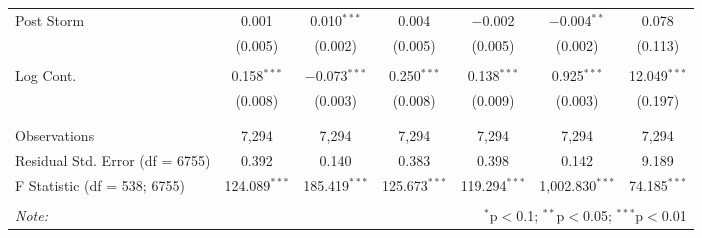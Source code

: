 \begin{table}[!htbp]
\begin{tabular}{@{\extracolsep{5pt}}lcccccc}
 Post Storm & 0.001 & 0.010$^{***}$ & 0.004 & $-$0.002 & $-$0.004$^{**}$ & 0.078 \\ 
  & (0.005) & (0.002) & (0.005) & (0.005) & (0.002) & (0.113) \\ 
  & & & & & & \\ 
 Log Cont. & 0.158$^{***}$ & $-$0.073$^{***}$ & 0.250$^{***}$ & 0.138$^{***}$ & 0.925$^{***}$ & 12.049$^{***}$ \\ 
  & (0.008) & (0.003) & (0.008) & (0.009) & (0.003) & (0.197) \\ 
  & & & & & & \\ 
\hline \\[-1.8ex] 
Observations & 7,294 & 7,294 & 7,294 & 7,294 & 7,294 & 7,294 \\ 
Residual Std. Error (df = 6755) & 0.392 & 0.140 & 0.383 & 0.398 & 0.142 & 9.189 \\ 
F Statistic (df = 538; 6755) & 124.089$^{***}$ & 185.419$^{***}$ & 125.673$^{***}$ & 119.294$^{***}$ & 1,002.830$^{***}$ & 74.185$^{***}$ \\ 
\hline 
\hline \\[-1.8ex] 
\textit{Note:}  & \multicolumn{6}{r}{$^{*}$p$<$0.1; $^{**}$p$<$0.05; $^{***}$p$<$0.01} \\ 
\end{tabular} 
\end{table} 

